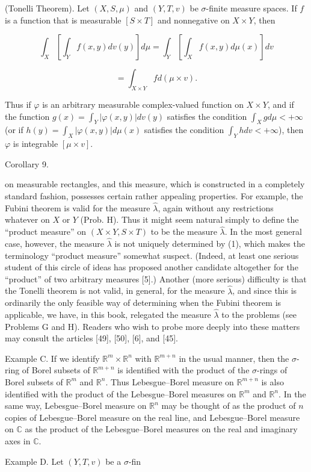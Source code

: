 (Tonelli Theorem). Let $(X, S, \mu)$ and $(Y, T, v)$ be $\sigma$-finite measure spaces. If $f$ is a function that is measurable $[S \times T]$ and nonnegative on $X \times Y$, then

$$\int_X \left[ \int_Y f(x, y)dv(y) \right] d\mu = \int_Y \left[ \int_X f(x, y)d\mu(x) \right] dv$$

$$= \int_{X \times Y} f d(\mu \times v).$$

Thus if $\varphi$ is an arbitrary measurable complex-valued function on $X \times Y$, and if the function $g(x) = \int_Y |\varphi(x, y)|dv(y)$ satisfies the condition $\int_X g d\mu < +\infty$ (or if $h(y) = \int_X |\varphi(x, y)|d\mu(x)$ satisfies the condition $\int_Y h dv < +\infty$), then $\varphi$ is integrable $[\mu \times v]$.

Corollary 9.

on measurable rectangles, and this measure, which is constructed in a completely standard fashion, possesses certain rather appealing properties. For example, the Fubini theorem is valid for the measure $\hat{\lambda}$, again without any restrictions whatever on $X$ or $Y$ (Prob. H). Thus it might seem natural simply to define the “product measure” on $(X \times Y, S \times T)$ to be the measure $\hat{\lambda}$. In the most general case, however, the measure $\hat{\lambda}$ is not uniquely determined by (1), which makes the terminology “product measure” somewhat suspect. (Indeed, at least one serious student of this circle of ideas has proposed another candidate altogether for the “product” of two arbitrary measures [5].) Another (more serious) difficulty is that the Tonelli theorem is not valid, in general, for the measure $\hat{\lambda}$, and since this is ordinarily the only feasible way of determining when the Fubini theorem is applicable, we have, in this book, relegated the measure $\hat{\lambda}$ to the problems (see Problems G and H). Readers who wish to probe more deeply into these matters may consult the articles [49], [50], [6], and [45].

Example C. If we identify $\mathbb{R}^m \times \mathbb{R}^n$ with $\mathbb{R}^{m+n}$ in the usual manner, then the $\sigma$-ring of Borel subsets of $\mathbb{R}^{m+n}$ is identified with the product of the $\sigma$-rings of Borel subsets of $\mathbb{R}^m$ and $\mathbb{R}^n$. Thus Lebesgue–Borel measure on $\mathbb{R}^{m+n}$ is also identified with the product of the Lebesgue–Borel measures on $\mathbb{R}^m$ and $\mathbb{R}^n$. In the same way, Lebesgue–Borel measure on $\mathbb{R}^n$ may be thought of as the product of $n$ copies of Lebesgue–Borel measure on the real line, and Lebesgue–Borel measure on $\mathbb{C}$ as the product of the Lebesgue–Borel measures on the real and imaginary axes in $\mathbb{C}$.

Example D. Let $(Y, T, v)$ be a $\sigma$-fin
